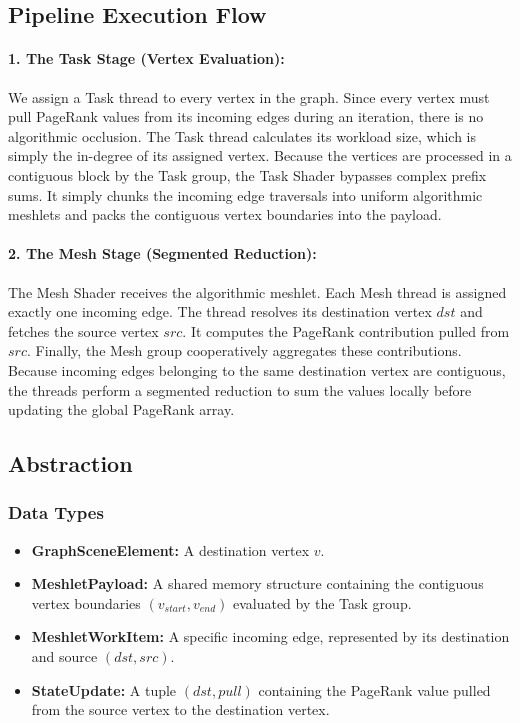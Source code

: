 \documentclass[11pt, a4paper]{article}
\begin{document}
\subsection{Pipeline Execution Flow}

\paragraph{1. The Task Stage (Vertex Evaluation):}
We assign a Task thread to every vertex in the graph. Since every vertex must pull PageRank values from its incoming edges during an iteration, there is no algorithmic occlusion. The Task thread calculates its workload size, which is simply the in-degree of its assigned vertex. Because the vertices are processed in a contiguous block by the Task group, the Task Shader bypasses complex prefix sums. It simply chunks the incoming edge traversals into uniform algorithmic meshlets and packs the contiguous vertex boundaries into the payload.

\paragraph{2. The Mesh Stage (Segmented Reduction):}
The Mesh Shader receives the algorithmic meshlet. Each Mesh thread is assigned exactly one incoming edge. The thread resolves its destination vertex $dst$ and fetches the source vertex $src$. It computes the PageRank contribution pulled from $src$. Finally, the Mesh group cooperatively aggregates these contributions. Because incoming edges belonging to the same destination vertex are contiguous, the threads perform a segmented reduction to sum the values locally before updating the global PageRank array.

\subsection{Abstraction}
\subsubsection{Data Types}
\begin{itemize}
    \item \textbf{GraphSceneElement:} A destination vertex $v$.
    \item \textbf{MeshletPayload:} A shared memory structure containing the contiguous vertex boundaries $(v_{start}, v_{end})$ evaluated by the Task group.
    \item \textbf{MeshletWorkItem:} A specific incoming edge, represented by its destination and source $(dst, src)$.
    \item \textbf{StateUpdate:} A tuple $(dst, pull)$ containing the PageRank value pulled from the source vertex to the destination vertex.
\end{itemize}
\end{document}
